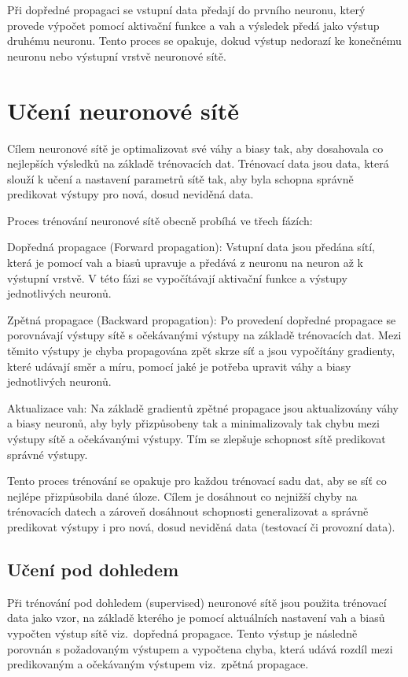 Při dopředné propagaci se vstupní data předají do prvního neuronu, který provede výpočet pomocí aktivační funkce a vah a výsledek předá jako výstup druhému neuronu.
Tento proces se opakuje, dokud výstup nedorazí ke konečnému neuronu nebo výstupní vrstvě neuronové sítě.

\section{Učení neuronové sítě}
Cílem neuronové sítě je optimalizovat své váhy a biasy tak, aby dosahovala co nejlepších výsledků na základě trénovacích dat.
Trénovací data jsou data, která slouží k učení a nastavení parametrů sítě tak, aby byla schopna správně predikovat výstupy pro nová, dosud neviděná data.

Proces trénování neuronové sítě obecně probíhá ve třech fázích:

Dopředná propagace (Forward propagation): Vstupní data jsou předána sítí, která je pomocí vah a biasů upravuje a předává z neuronu na neuron až k výstupní vrstvě.
V této fázi se vypočítávají aktivační funkce a výstupy jednotlivých neuronů.

Zpětná propagace (Backward propagation): Po provedení dopředné propagace se porovnávají výstupy sítě s očekávanými výstupy na základě trénovacích dat.
Mezi těmito výstupy je chyba propagována zpět skrze síť a jsou vypočítány gradienty, které udávají směr a míru, pomocí jaké je potřeba upravit váhy a biasy jednotlivých neuronů.
    
Aktualizace vah: Na základě gradientů zpětné propagace jsou aktualizovány váhy a biasy neuronů, aby byly přizpůsobeny tak a minimalizovaly tak chybu mezi výstupy sítě a očekávanými výstupy.
Tím se zlepšuje schopnost sítě predikovat správné výstupy.

Tento proces trénování se opakuje pro každou trénovací sadu dat, aby se síť co nejlépe přizpůsobila dané úloze.
Cílem je dosáhnout co nejnižší chyby na trénovacích datech a zároveň dosáhnout schopnosti generalizovat a správně predikovat výstupy i pro nová, dosud neviděná data (testovací či provozní data).

\subsection{Učení pod dohledem}
Při trénování pod dohledem (supervised) neuronové sítě jsou použita trénovací data jako vzor, na základě kterého je pomocí aktuálních nastavení vah a biasů vypočten výstup sítě viz.~dopředná propagace.
Tento výstup je následně porovnán s požadovaným výstupem a vypočtena chyba, která udává rozdíl mezi predikovaným a očekávaným výstupem viz.~zpětná propagace.

